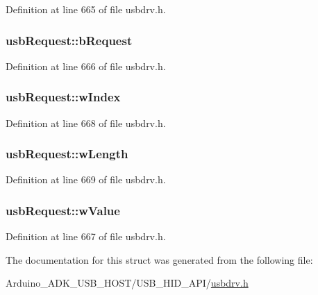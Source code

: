 Definition at line 665 of file usbdrv.\-h.

\hypertarget{structusb_request_a34c18b1dd0af60774cac48b176220c2c}{
\subsubsection[{b\-Request}]{ usb\-Request\-::b\-Request}}\label{structusb_request_a34c18b1dd0af60774cac48b176220c2c}


Definition at line 666 of file usbdrv.\-h.

\hypertarget{structusb_request_aefa059246bf079d5b42af148a2ad6a95}{
\subsubsection[{w\-Index}]{ usb\-Request\-::w\-Index}}\label{structusb_request_aefa059246bf079d5b42af148a2ad6a95}


Definition at line 668 of file usbdrv.\-h.

\hypertarget{structusb_request_a770437881c2e37d1384982fe26d87e7f}{
\subsubsection[{w\-Length}]{ usb\-Request\-::w\-Length}}\label{structusb_request_a770437881c2e37d1384982fe26d87e7f}


Definition at line 669 of file usbdrv.\-h.

\hypertarget{structusb_request_ab3f8687bb757c53ed03c3ce4310dc5c5}{
\subsubsection[{w\-Value}]{ usb\-Request\-::w\-Value}}\label{structusb_request_ab3f8687bb757c53ed03c3ce4310dc5c5}


Definition at line 667 of file usbdrv.\-h.



The documentation for this struct was generated from the following file\-:\begin{DoxyCompactItemize}
\item 
Arduino\-\_\-\-A\-D\-K\-\_\-\-U\-S\-B\-\_\-\-H\-O\-S\-T/\-U\-S\-B\-\_\-\-H\-I\-D\-\_\-\-A\-P\-I/\hyperlink{usbdrv_8h}{usbdrv.\-h}\end{DoxyCompactItemize}
